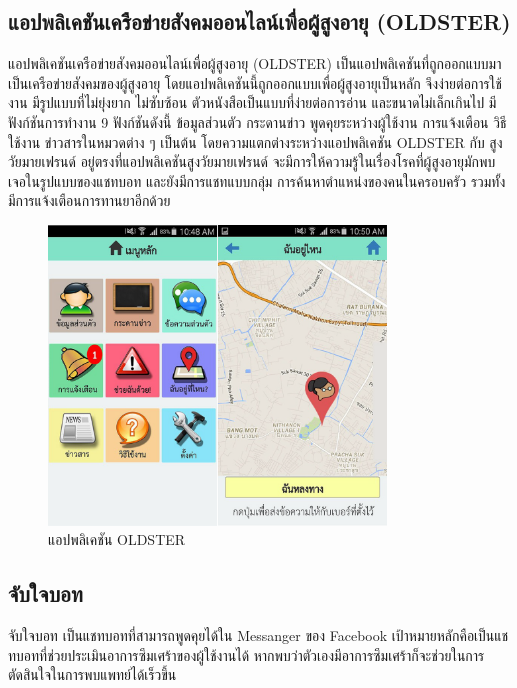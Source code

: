 \subsection{แอปพลิเคชันเครือข่ายสังคมออนไลน์เพื่อผู้สูงอายุ (OLDSTER) }
แอปพลิเคชันเครือข่ายสังคมออนไลน์เพื่อผู้สูงอายุ (OLDSTER) \cite{oldsterref} เป็นแอปพลิเคชันที่ถูกออกแบบมาเป็นเครือข่ายสังคมของผู้สูงอายุ โดยแอปพลิเคชันนี้ถูกออกแบบเพื่อผู้สูงอายุเป็นหลัก จึงง่ายต่อการใช้งาน มีรูปแบบที่ไม่ยุ่งยาก ไม่ซับซ้อน ตัวหนังสือเป็นแบบที่ง่ายต่อการอ่าน และขนาดไม่เล็กเกินไป 
มีฟังก์ชันการทำงาน 9 ฟังก์ชันดังนี้ ข้อมูลส่วนตัว กระดานข่าว พูดคุยระหว่างผู้ใช้งาน การแจ้งเตือน วิธีใช้งาน ข่าวสารในหมวดต่าง ๆ เป็นต้น โดยความแตกต่างระหว่างแอปพลิเคชัน OLDSTER กับ สูงวัยมายเฟรนด์ อยู่ตรงที่แอปพลิเคชันสูงวัยมายเฟรนด์
จะมีการให้ความรู้ในเรื่องโรคที่ผู้สูงอายุมักพบเจอในรูปแบบของแชทบอท และยังมีการแชทแบบกลุ่ม การค้นหาตำแหน่งของคนในครอบครัว รวมทั้งมีการแจ้งเตือนการทานยาอีกด้วย
\begin{figure}[H]
\centering
\includegraphics[width=0.8\textwidth]{Figures/2/oldsterfull}
\caption{แอปพลิเคชัน OLDSTER}
\label{Fig:ref1}
\end{figure}
	
\subsection{จับใจบอท}
จับใจบอท \cite{eStudentloan} เป็นแชทบอทที่สามารถพูดคุยได้ใน Messanger ของ Facebook เป้าหมายหลักคือเป็นแชทบอทที่ช่วยประเมินอาการซึมเศร้าของผู้ใช้งานได้ หากพบว่าตัวเองมีอาการซึมเศร้าก็จะช่วยในการตัดสินใจในการพบแพทย์ได้เร็วขึ้น 


